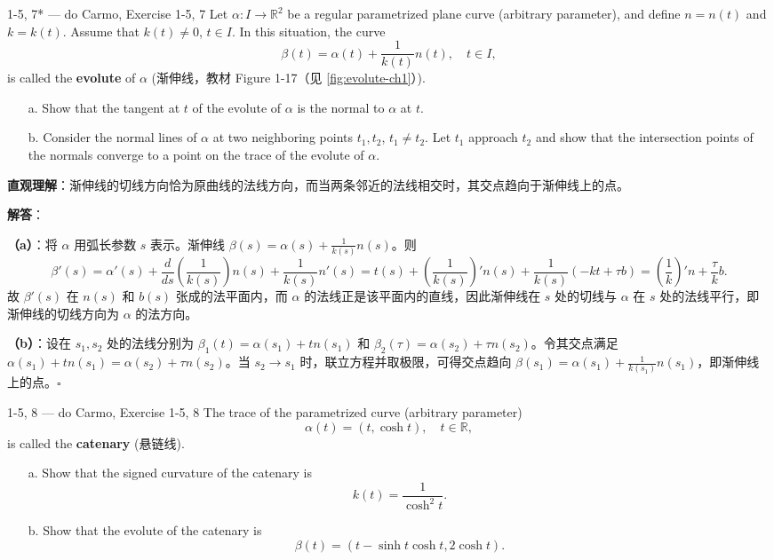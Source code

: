 \begin{exercise}{1-5, 7* — do Carmo, Exercise 1-5, 7}
Let $\alpha: I \to \mathbb{R}^2$ be a regular parametrized plane curve (arbitrary parameter), and define $n = n(t)$ and $k = k(t)$. Assume that $k(t) \neq 0$, $t \in I$. In this situation, the curve
\[
\beta(t) = \alpha(t) + \frac{1}{k(t)} n(t), \quad t \in I,
\]
is called the \textbf{evolute} of $\alpha$ (渐伸线，教材 Figure 1-17（见 \cref{fig:evolute-ch1}）).
\begin{enumerate}
\item[a.] Show that the tangent at $t$ of the evolute of $\alpha$ is the normal to $\alpha$ at $t$.
\item[b.] Consider the normal lines of $\alpha$ at two neighboring points $t_1, t_2$, $t_1 \neq t_2$. Let $t_1$ approach $t_2$ and show that the intersection points of the normals converge to a point on the trace of the evolute of $\alpha$.
\end{enumerate}
\end{exercise}

\begin{solution}
\textbf{直观理解}：渐伸线的切线方向恰为原曲线的法线方向，而当两条邻近的法线相交时，其交点趋向于渐伸线上的点。

\textbf{解答}：

\textbf{（a）}：将 $\alpha$ 用弧长参数 $s$ 表示。渐伸线 $\beta(s) = \alpha(s) + \frac{1}{k(s)}n(s)$。则
\[
\beta'(s) = \alpha'(s) + \frac{d}{ds}\!\left(\frac{1}{k(s)}\right)n(s) + \frac{1}{k(s)}n'(s) = t(s) + \left(\frac{1}{k(s)}\right)'n(s) + \frac{1}{k(s)}(-kt + \tau b) = \left(\frac{1}{k}\right)'n + \frac{\tau}{k}b.
\]
故 $\beta'(s)$ 在 $n(s)$ 和 $b(s)$ 张成的法平面内，而 $\alpha$ 的法线正是该平面内的直线，因此渐伸线在 $s$ 处的切线与 $\alpha$ 在 $s$ 处的法线平行，即渐伸线的切线方向为 $\alpha$ 的法方向。

\textbf{（b）}：设在 $s_1, s_2$ 处的法线分别为 $\beta_1(t) = \alpha(s_1) + tn(s_1)$ 和 $\beta_2(\tau) = \alpha(s_2) + \tau n(s_2)$。令其交点满足 $\alpha(s_1) + tn(s_1) = \alpha(s_2) + \tau n(s_2)$。当 $s_2 \to s_1$ 时，联立方程并取极限，可得交点趋向 $\beta(s_1) = \alpha(s_1) + \frac{1}{k(s_1)}n(s_1)$，即渐伸线上的点。$\square$
\end{solution}

\begin{exercise}{1-5, 8 — do Carmo, Exercise 1-5, 8}
The trace of the parametrized curve (arbitrary parameter)
\[
\alpha(t) = (t, \cosh t), \quad t \in \mathbb{R},
\]
is called the \textbf{catenary} (悬链线).
\begin{enumerate}
\item[a.] Show that the signed curvature of the catenary is
\[
k(t) = \frac{1}{\cosh^2 t}.
\]
\item[b.] Show that the evolute of the catenary is
\[
\beta(t) = (t - \sinh t \cosh t, 2\cosh t).
\]
\end{enumerate}
\end{exercise}

